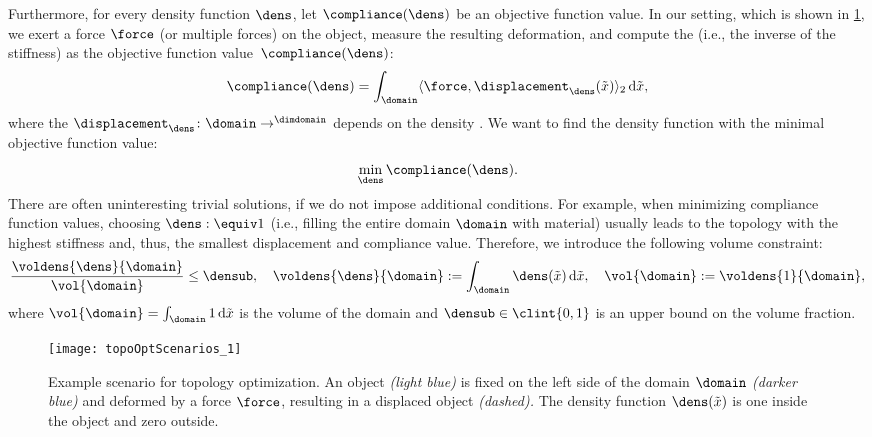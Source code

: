 Furthermore, for every density function $\dens$,
let $\compliance(\dens)$ be an objective function value.
In our setting, which is shown in \cref{fig:topoOptExampleScenario},
we exert a force $\force$ (or multiple forces) on the object,
measure the resulting deformation, and
compute the  (i.e., the inverse of the stiffness) as
the objective function value~$\compliance(\dens)$:
\begin{equation}
  \compliance(\dens)
  = \int_{\domain} \innerprod[2]{\force}{\displacement_{\dens}(\tilde{\*x})}
  \diff\tilde{\*x},
\end{equation}
where the 
$\displacement_{\dens}\colon \domain \to \real^{\dimdomain}$
depends on the density \cite{Huebner14Mehrdimensionale}.
We want to find the density function
with the minimal objective function value:
\begin{equation}
  \label{eq:topoOptProblemContinuous}
  \min_{\dens} \compliance(\dens).
\end{equation}
There are often uninteresting trivial solutions,
if we do not impose additional conditions.
For example, when minimizing compliance function values,
choosing $\dens :\equiv 1$
(i.e., filling the entire domain $\domain$ with material)
usually leads to the topology with the
highest stiffness and, thus, the smallest displacement and compliance value.
Therefore, we introduce the following volume constraint:
\begin{equation}
  \frac{\voldens{\dens}{\domain}}{\vol{\domain}} \le \densub,\quad
  \voldens{\dens}{\domain}
  := \int_{\domain} \dens(\tilde{\*x}) \diff\tilde{\*x},\quad
  \vol{\domain}
  := \voldens{1}{\domain},
\end{equation}
where $\vol{\domain} = \int_{\domain} 1 \diff\tilde{\*x}$
is the volume of the domain and
$\densub \in \clint{0, 1}$ is an upper bound on the volume fraction.

\begin{SCfigure}
  \texttt{[image: topoOptScenarios\_1]}%
  \caption[%
    Example scenario for topology optimization%
  ]{%
    Example scenario for topology optimization.
    An object \emph{\textcolor{hellblau}{(light blue)}}
    is fixed on the left side
    of the domain $\domain$
    \emph{\textcolor{mittelblau!50}{(darker blue)}}
    and deformed by a force $\force$, resulting in a displaced object
    \emph{(dashed).}
    The density function $\dens(\tilde{\*x})$ is one inside the object
    and zero outside.%
  }%
  \label{fig:topoOptExampleScenario}%
\end{SCfigure}



